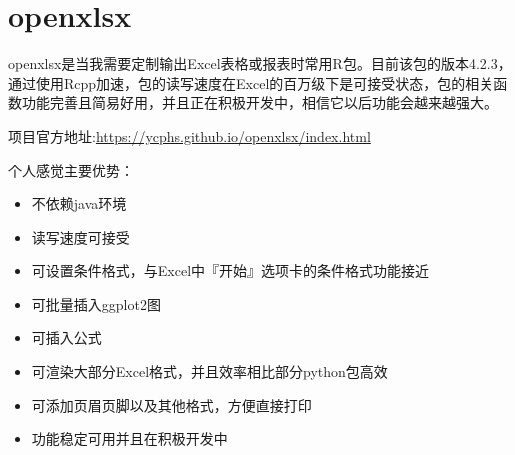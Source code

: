\documentclass[
]{book}
\newenvironment{Shaded}{\begin{snugshade}}{\end{snugshade}}
\newcommand{\AttributeTok}[1]{\textcolor[rgb]{0.77,0.63,0.00}{#1}}
\newcommand{\CommentTok}[1]{\textcolor[rgb]{0.56,0.35,0.01}{\textit{#1}}}
\newcommand{\ConstantTok}[1]{\textcolor[rgb]{0.00,0.00,0.00}{#1}}
\newcommand{\DecValTok}[1]{\textcolor[rgb]{0.00,0.00,0.81}{#1}}
\newcommand{\FunctionTok}[1]{\textcolor[rgb]{0.00,0.00,0.00}{#1}}
\newcommand{\NormalTok}[1]{#1}
\newcommand{\OtherTok}[1]{\textcolor[rgb]{0.56,0.35,0.01}{#1}}
\newcommand{\SpecialCharTok}[1]{\textcolor[rgb]{0.00,0.00,0.00}{#1}}
\newcommand{\StringTok}[1]{\textcolor[rgb]{0.31,0.60,0.02}{#1}}
\providecommand{\tightlist}{%
  \setlength{\itemsep}{0pt}\setlength{\parskip}{0pt}}
\begin{document}
\begin{Shaded}
\end{Shaded}

\hypertarget{openxlsx:description}{%
\section{openxlsx}\label{openxlsx:description}}

openxlsx是当我需要定制输出Excel表格或报表时常用R包。目前该包的版本4.2.3，通过使用Rcpp加速，包的读写速度在Excel的百万级下是可接受状态，包的相关函数功能完善且简易好用，并且正在积极开发中，相信它以后功能会越来越强大。

项目官方地址:\url{https://ycphs.github.io/openxlsx/index.html}

个人感觉主要优势：

\begin{itemize}
\tightlist
\item
  不依赖java环境
\item
  读写速度可接受
\item
  可设置条件格式，与Excel中『开始』选项卡的条件格式功能接近
\item
  可批量插入ggplot2图
\item
  可插入公式
\item
  可渲染大部分Excel格式，并且效率相比部分python包高效
\item
  可添加页眉页脚以及其他格式，方便直接打印
\item
  功能稳定可用并且在积极开发中
\end{itemize}
\end{document}

